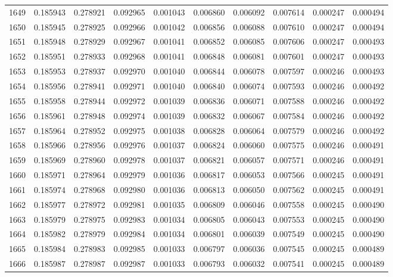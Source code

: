 \begin{tabular}{lrrrrrrrrr}
1649 & 0.185943 & 0.278921 & 0.092965 & 0.001043 & 0.006860 & 0.006092 & 0.007614 & 0.000247 & 0.000494 \\
1650 & 0.185945 & 0.278925 & 0.092966 & 0.001042 & 0.006856 & 0.006088 & 0.007610 & 0.000247 & 0.000494 \\
1651 & 0.185948 & 0.278929 & 0.092967 & 0.001041 & 0.006852 & 0.006085 & 0.007606 & 0.000247 & 0.000493 \\
1652 & 0.185951 & 0.278933 & 0.092968 & 0.001041 & 0.006848 & 0.006081 & 0.007601 & 0.000247 & 0.000493 \\
1653 & 0.185953 & 0.278937 & 0.092970 & 0.001040 & 0.006844 & 0.006078 & 0.007597 & 0.000246 & 0.000493 \\
1654 & 0.185956 & 0.278941 & 0.092971 & 0.001040 & 0.006840 & 0.006074 & 0.007593 & 0.000246 & 0.000492 \\
1655 & 0.185958 & 0.278944 & 0.092972 & 0.001039 & 0.006836 & 0.006071 & 0.007588 & 0.000246 & 0.000492 \\
1656 & 0.185961 & 0.278948 & 0.092974 & 0.001039 & 0.006832 & 0.006067 & 0.007584 & 0.000246 & 0.000492 \\
1657 & 0.185964 & 0.278952 & 0.092975 & 0.001038 & 0.006828 & 0.006064 & 0.007579 & 0.000246 & 0.000492 \\
1658 & 0.185966 & 0.278956 & 0.092976 & 0.001037 & 0.006824 & 0.006060 & 0.007575 & 0.000246 & 0.000491 \\
1659 & 0.185969 & 0.278960 & 0.092978 & 0.001037 & 0.006821 & 0.006057 & 0.007571 & 0.000246 & 0.000491 \\
1660 & 0.185971 & 0.278964 & 0.092979 & 0.001036 & 0.006817 & 0.006053 & 0.007566 & 0.000245 & 0.000491 \\
1661 & 0.185974 & 0.278968 & 0.092980 & 0.001036 & 0.006813 & 0.006050 & 0.007562 & 0.000245 & 0.000491 \\
1662 & 0.185977 & 0.278972 & 0.092981 & 0.001035 & 0.006809 & 0.006046 & 0.007558 & 0.000245 & 0.000490 \\
1663 & 0.185979 & 0.278975 & 0.092983 & 0.001034 & 0.006805 & 0.006043 & 0.007553 & 0.000245 & 0.000490 \\
1664 & 0.185982 & 0.278979 & 0.092984 & 0.001034 & 0.006801 & 0.006039 & 0.007549 & 0.000245 & 0.000490 \\
1665 & 0.185984 & 0.278983 & 0.092985 & 0.001033 & 0.006797 & 0.006036 & 0.007545 & 0.000245 & 0.000489 \\
1666 & 0.185987 & 0.278987 & 0.092987 & 0.001033 & 0.006793 & 0.006032 & 0.007541 & 0.000245 & 0.000489 \\

\end{tabular}

